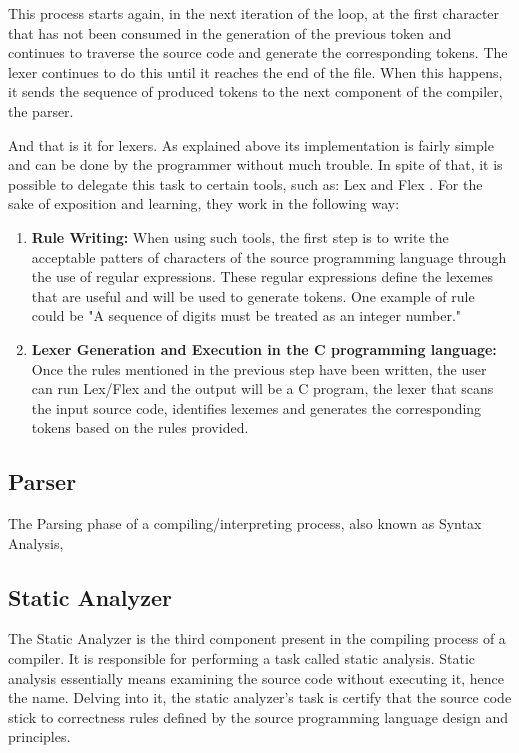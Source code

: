 This process starts again, in the next iteration of the loop, at the first character that has not been consumed in the generation of the previous token and continues to traverse the source code and generate the corresponding tokens. The lexer continues to do this until it reaches the end of the file. When this happens, it sends the sequence of produced tokens to the next component of the compiler, the parser.

And that is it for lexers. As explained above its implementation is fairly simple and can be done by the programmer without much trouble. In spite of that, it is possible to delegate this task to certain tools, such as: Lex \cite{lesk1975lex} and Flex \cite{Flex}. For the sake of exposition and learning, they work in the following way:

\begin{enumerate}
    \item \textbf{Rule Writing:} When using such tools, the first step is to write the acceptable patters of characters of the source programming language through the use of regular expressions. These regular expressions define the lexemes that are useful and will be used to generate tokens. One example of rule could be "A sequence of digits must be treated as an integer number."
    
    \item \textbf{Lexer Generation and Execution in the C programming language:} Once the rules mentioned in the previous step have been written, the user can run Lex/Flex and the output will be a C program, the lexer that scans the input source code, identifies lexemes and generates the corresponding tokens based on the rules provided.
    
\end{enumerate}

\subsection{Parser}
The Parsing phase of a compiling/interpreting process, also known as Syntax Analysis,

\subsection{Static Analyzer}
The Static Analyzer is the third component present in the compiling process of a compiler. It is responsible for performing a task called static analysis. Static analysis essentially means examining the source code without executing it, hence the name. Delving into it, the static analyzer's task is certify that the source code stick to correctness rules defined by the source programming language design and principles.

